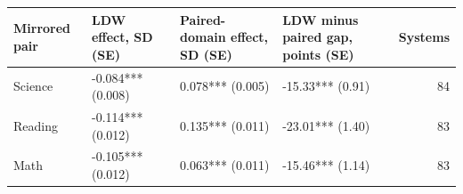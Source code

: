 \begin{tabular}{llllr}
\toprule
Mirrored pair & LDW effect, SD (SE) & Paired-domain effect, SD (SE) & LDW minus paired gap, points (SE) & Systems \\
\midrule
Science & -0.084*** (0.008) & 0.078*** (0.005) & -15.33*** (0.91) & 84 \\
Reading & -0.114*** (0.012) & 0.135*** (0.011) & -23.01*** (1.40) & 83 \\
Math & -0.105*** (0.012) & 0.063*** (0.011) & -15.46*** (1.14) & 83 \\
\bottomrule
\end{tabular}

